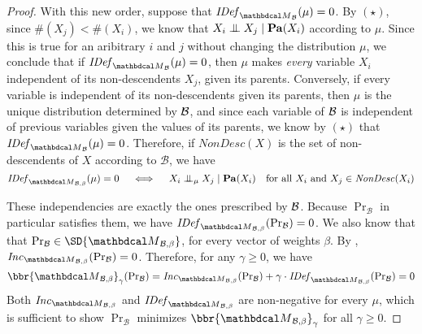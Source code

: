 \begin{proof}
	
	With this new order, suppose that 
	$\IDef{\PDGof{\cal B}}(\mu) = 0$.
	By $(\star)$, since $\#(X_j) < \#(X_i)$, we know that $X_i \mathrel{\perp\mspace{-10mu}\perp} X_j \mid \mathbf{Pa}(X_i)$ according to $\mu$. Since this is true for an aribitrary $i$ and $j$ without changing the distribution $\mu$, we conclude that if
	$\IDef{\PDGof{\cal B}}(\mu) = 0$, 
	then $\mu$ makes \emph{every} variable $X_i$ independent of its non-descendents $X_j$, given its parents.
	Conversely, if every variable is independent of its non-descendents given its parents, then $\mu$ is the unique distribution determined by $\cal B$, and since each variable of $\cal B$ is independent of previous variables given the values of its parents,  we know by $(\star)$ that
	$\IDef{\PDGof{\cal B}}(\mu) = 0$. 
	Therefore, if $\mathit{NonDesc}(X)$ is the set of non-descendents of $X$ according to $\mathcal B$, we have
\begin{equation}\label{eq:idef-bn-indeps}
 	\IDef{\PDGof{\mathcal B,\beta}}(\mu) = 0 \quad\iff\quad X_i \CI_\mu X_j \mid \Pa(X_i) \quad\text{for all $X_i$ and $X_j \in \mathit{NonDesc}(X_i)$} 
\end{equation}

These independencies are exactly the ones prescribed by $\cal B$.
Because $\Pr_{\mathcal B}$ in particular satisfies them,
we have $\IDef{\PDGof{\mathcal B,\beta}}(\Pr_{\cal B}) = 0$.
We also know that that $\Pr_{\cal B} \in \SD{\PDGof{\mathcal B,\beta}}$, for
every vector of weights $\beta$. By ,
$\Inc_{\PDGof{\mathcal B,\beta}}(\Pr_{\mathcal B}) = 0$. Therefore, for any
$\gamma \geq 0$, we have
\[ \bbr{\PDGof{\mathcal B, \beta}}_\gamma(\Pr\nolimits_{\cal B})
	= \Inc_{\PDGof{\mathcal B,\beta}}(\Pr\nolimits_{\mathcal B}) + \gamma \cdot
	\IDef{\PDGof{\mathcal B, \beta}}(\Pr\nolimits_{\cal B}) = 0
\]
Both $\Inc_{\PDGof{\mathcal B,\beta}}$ and $\IDef{\PDGof{\mathcal B, \beta}}$
are non-negative for every $\mu$, which is sufficient to show $\Pr_{\mathcal B}$
minimizes $\bbr{\PDGof{\mathcal B, \beta}}_\gamma$ for all $\gamma \geq 0$. 


\end{proof}
